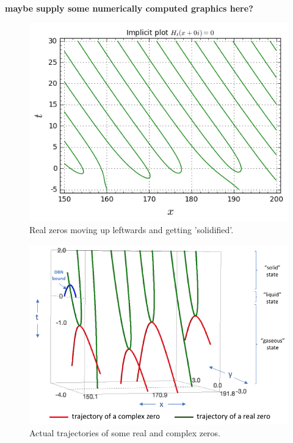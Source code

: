 \begin{remark}
{\bf maybe supply some numerically computed graphics here?}
\begin{figure}[h!]
  \includegraphics[width=0.9\linewidth]{real_zeros_solid.png}
  \caption{Real zeros moving up leftwards and getting 'solidified'.}
\end{figure}

\begin{figure}[h!]
  \includegraphics[width=0.9\linewidth]{Actual_trajectories_zeros.png}
  \caption{Actual trajectories of some real and complex zeros.}
\end{figure}

\end{remark}


